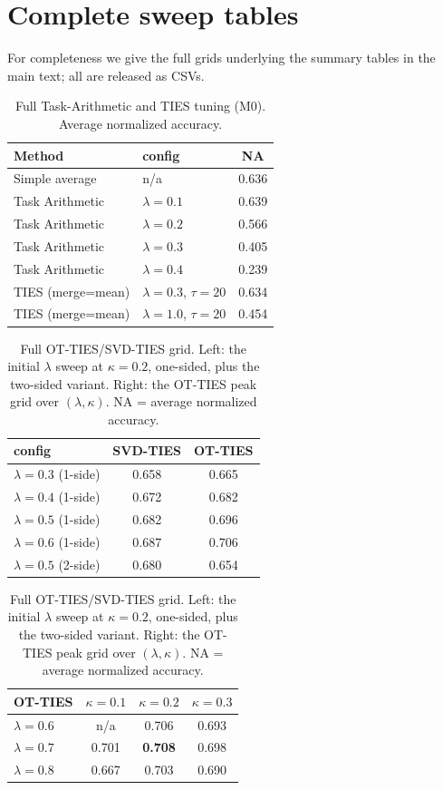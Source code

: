 \documentclass[11pt]{article}
\newcommand{\otties}{\textsc{OT-TIES}}
\newcommand{\svdties}{\textsc{SVD-TIES}}
\begin{document}
\section{Complete sweep tables}
\label{app:sweeps}
For completeness we give the full grids underlying the summary tables in the main text; all are released
as CSVs.

\begin{table}[h]
\centering
\caption{Full Task-Arithmetic and TIES tuning (M0). Average normalized accuracy.}
\label{tab:m0full}
\small
\begin{tabular}{llc}
\toprule
Method & config & NA \\
\midrule
Simple average & n/a & 0.636 \\
Task Arithmetic & $\lambda=0.1$ & 0.639 \\
Task Arithmetic & $\lambda=0.2$ & 0.566 \\
Task Arithmetic & $\lambda=0.3$ & 0.405 \\
Task Arithmetic & $\lambda=0.4$ & 0.239 \\
TIES (merge=mean) & $\lambda=0.3$, $\tau=20$ & 0.634 \\
TIES (merge=mean) & $\lambda=1.0$, $\tau=20$ & 0.454 \\
\bottomrule
\end{tabular}
\end{table}

\begin{table}[h]
\centering
\caption{Full \otties{}/\svdties{} grid. Left: the initial $\lambda$ sweep at $\kappa=0.2$, one-sided,
plus the two-sided variant. Right: the \otties{} peak grid over $(\lambda,\kappa)$. NA = average
normalized accuracy.}
\label{tab:m2full}
\small
\begin{minipage}{0.5\textwidth}\centering
\begin{tabular}{lcc}
\toprule
config & \svdties{} & \otties{} \\
\midrule
$\lambda{=}0.3$ (1-side) & 0.658 & 0.665 \\
$\lambda{=}0.4$ (1-side) & 0.672 & 0.682 \\
$\lambda{=}0.5$ (1-side) & 0.682 & 0.696 \\
$\lambda{=}0.6$ (1-side) & 0.687 & 0.706 \\
$\lambda{=}0.5$ (2-side) & 0.680 & 0.654 \\
\bottomrule
\end{tabular}
\end{minipage}%
\begin{minipage}{0.5\textwidth}\centering
\begin{tabular}{lccc}
\toprule
\otties{} & $\kappa{=}0.1$ & $\kappa{=}0.2$ & $\kappa{=}0.3$ \\
\midrule
$\lambda{=}0.6$ & n/a & 0.706 & 0.693 \\
$\lambda{=}0.7$ & 0.701 & \textbf{0.708} & 0.698 \\
$\lambda{=}0.8$ & 0.667 & 0.703 & 0.690 \\
\bottomrule
\end{tabular}
\end{minipage}
\end{table}
\end{document}
